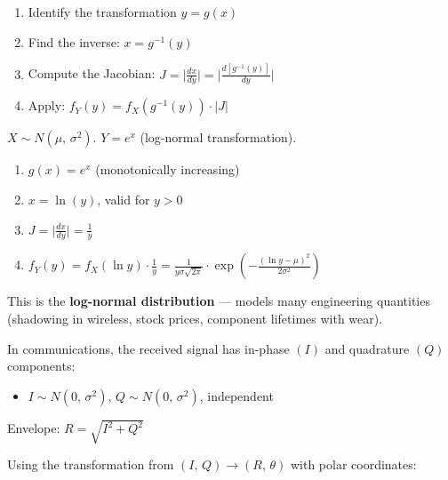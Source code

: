 

\begin{enumerate}
\def\labelenumi{\arabic{enumi}.}
\tightlist
\item
  Identify the transformation $y = g(x)$
\item
  Find the inverse: $x = g^{-1}(y)$
\item
  Compute the Jacobian: $J = \lvert \frac{dx}{dy}\rvert = \lvert \frac{d[g^{-1}(y)]}{dy}\rvert$
\item
  Apply: $f_{Y}(y) = f_{X}(g^{-1}(y)) \cdot \lvert J\rvert$
\end{enumerate}


$X \sim N(\mu,\, \sigma^{2})$. $Y = e^{x}$ (log-normal transformation).

\begin{enumerate}
\def\labelenumi{\arabic{enumi}.}
\tightlist
\item
  $g(x) = e^{x}$ (monotonically increasing)
\item
  $x = \ln (y)$, valid for $y > 0$
\item
  $\displaystyle J = \lvert \frac{dx}{dy}\rvert = \frac{1}{y}$
\item
  $\displaystyle f_{Y}(y) = f_{X}(\ln y) \cdot \frac{1}{y} = \frac{1}{y\sigma \sqrt{2\pi}} \cdot \exp \left(-\frac{(\ln y - \mu)^{2}}{2\sigma^{2}}\right)$
\end{enumerate}

This is the \textbf{log-normal distribution} — models many engineering quantities (shadowing in wireless, stock prices, component lifetimes with wear).



In communications, the received signal has in-phase $(I)$ and quadrature $(Q)$ components:

\begin{itemize}
\tightlist
\item
  $I \sim N(0,\, \sigma^{2}),\, Q \sim N(0,\, \sigma^{2})$, independent
\end{itemize}

Envelope: $R = \sqrt{I^{2} + Q^{2}}$

Using the transformation from $(I,\, Q) \to (R,\, \theta)$ with polar coordinates:

